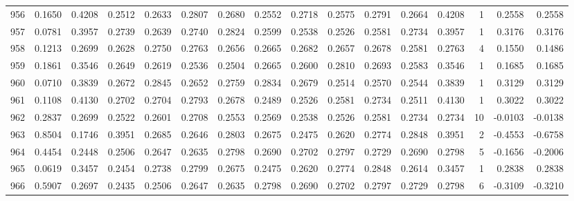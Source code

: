 \begin{tabular}{lrrrrrrrrrrrrrrr}
956 &      0.1650 &  0.4208 &  0.2512 &  0.2633 &  0.2807 &  0.2680 &  0.2552 &  0.2718 &  0.2575 &  0.2791 &   0.2664 &     0.4208 &      1 &                    0.2558 &                     0.2558 \\
957 &      0.0781 &  0.3957 &  0.2739 &  0.2639 &  0.2740 &  0.2824 &  0.2599 &  0.2538 &  0.2526 &  0.2581 &   0.2734 &     0.3957 &      1 &                    0.3176 &                     0.3176 \\
958 &      0.1213 &  0.2699 &  0.2628 &  0.2750 &  0.2763 &  0.2656 &  0.2665 &  0.2682 &  0.2657 &  0.2678 &   0.2581 &     0.2763 &      4 &                    0.1550 &                     0.1486 \\
959 &      0.1861 &  0.3546 &  0.2649 &  0.2619 &  0.2536 &  0.2504 &  0.2665 &  0.2600 &  0.2810 &  0.2693 &   0.2583 &     0.3546 &      1 &                    0.1685 &                     0.1685 \\
960 &      0.0710 &  0.3839 &  0.2672 &  0.2845 &  0.2652 &  0.2759 &  0.2834 &  0.2679 &  0.2514 &  0.2570 &   0.2544 &     0.3839 &      1 &                    0.3129 &                     0.3129 \\
961 &      0.1108 &  0.4130 &  0.2702 &  0.2704 &  0.2793 &  0.2678 &  0.2489 &  0.2526 &  0.2581 &  0.2734 &   0.2511 &     0.4130 &      1 &                    0.3022 &                     0.3022 \\
962 &      0.2837 &  0.2699 &  0.2522 &  0.2601 &  0.2708 &  0.2553 &  0.2569 &  0.2538 &  0.2526 &  0.2581 &   0.2734 &     0.2734 &     10 &                   -0.0103 &                    -0.0138 \\
963 &      0.8504 &  0.1746 &  0.3951 &  0.2685 &  0.2646 &  0.2803 &  0.2675 &  0.2475 &  0.2620 &  0.2774 &   0.2848 &     0.3951 &      2 &                   -0.4553 &                    -0.6758 \\
964 &      0.4454 &  0.2448 &  0.2506 &  0.2647 &  0.2635 &  0.2798 &  0.2690 &  0.2702 &  0.2797 &  0.2729 &   0.2690 &     0.2798 &      5 &                   -0.1656 &                    -0.2006 \\
965 &      0.0619 &  0.3457 &  0.2454 &  0.2738 &  0.2799 &  0.2675 &  0.2475 &  0.2620 &  0.2774 &  0.2848 &   0.2614 &     0.3457 &      1 &                    0.2838 &                     0.2838 \\
966 &      0.5907 &  0.2697 &  0.2435 &  0.2506 &  0.2647 &  0.2635 &  0.2798 &  0.2690 &  0.2702 &  0.2797 &   0.2729 &     0.2798 &      6 &                   -0.3109 &                    -0.3210 \\

\end{tabular}

